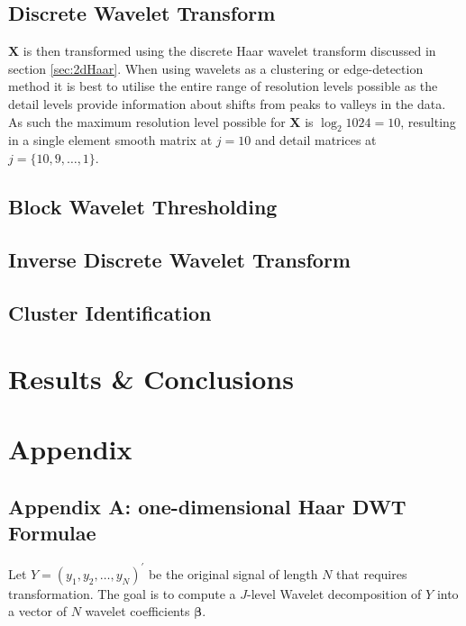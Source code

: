 \documentclass[a4paper, 12pt]{article}
\begin{document}
\subsection{Discrete Wavelet Transform}
$\mathbf{X}$ is then transformed using the discrete Haar wavelet transform discussed in section \ref{sec:2dHaar}. When using wavelets as a clustering or edge-detection method it is best to utilise the entire range of resolution levels possible as the detail levels provide information about shifts from peaks to valleys in the data. As such the maximum resolution level possible for $\mathbf{X}$ is $\log_{2}1024 = 10$, resulting in a single element smooth matrix at $j = 10$ and detail matrices at $j = \{10, 9, \ldots, 1\}$. 

\subsection{Block Wavelet Thresholding}

\subsection{Inverse Discrete Wavelet Transform}

\subsection{Cluster Identification}

\newpage
\section{Results \& Conclusions}


\newpage
{}



\newpage
{}
\section*{Appendix}
\subsection*{Appendix A: one-dimensional Haar DWT Formulae}\label{App:DWT1d}
Let $Y = (y_{1}, y_{2}, \ldots, y_{N})^{\prime}$ be the original signal of length $N$ that requires transformation. The goal is to compute a $J$-level Wavelet decomposition of $Y$ into a vector of $N$ wavelet coefficients $\bm{\beta}$.
\end{document}
